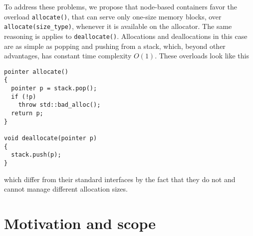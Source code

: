 \documentclass[11pt]{article}
\begin{document}
To address these problems, we propose that node-based containers favor
the overload \texttt{allocate()}, that can serve only one-size
memory blocks, over \texttt{allocate(size\_type)}, whenever it is
available on the allocator.  The same reasoning is applies to \texttt{deallocate()}.
Allocations and deallocations in this case are as simple as popping and pushing
from a stack, which, beyond other advantages, has constant time complexity
$O(1)$.  These overloads look like this

\medskip
\begin{lstlisting}
pointer allocate()
{
  pointer p = stack.pop(); 
  if (!p)
    throw std::bad_alloc();
  return p; 
}

void deallocate(pointer p)
{
  stack.push(p);
}
\end{lstlisting}
which differ from their standard interfaces by the fact
that they do not and cannot manage different allocation sizes.

\section{Motivation and scope}
\end{document}

